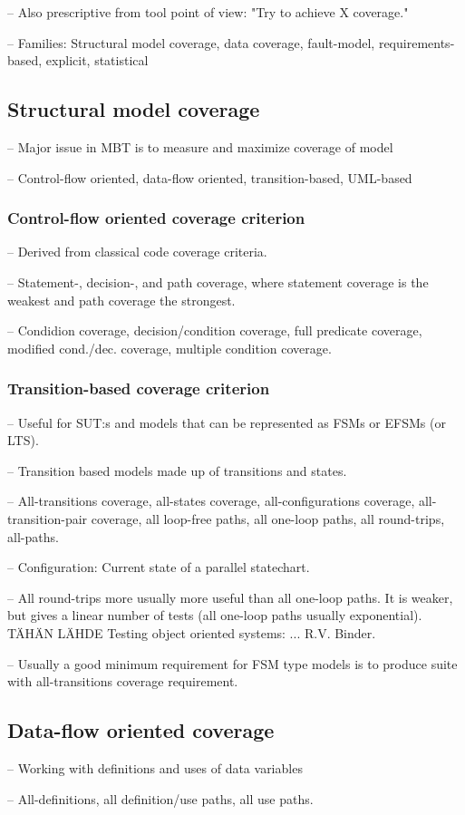 -- Also prescriptive from tool point of view: "Try to achieve X coverage."

-- Families: Structural model coverage, data coverage, fault-model, requirements-based, explicit, statistical

\subsection{Structural model coverage}
-- Major issue in MBT is to measure and maximize coverage of model

-- Control-flow oriented, data-flow oriented, transition-based, UML-based

\subsubsection{Control-flow oriented coverage criterion}
--  Derived from classical code coverage criteria.

-- Statement-, decision-, and path coverage, where statement coverage is the weakest and path coverage the strongest.

-- Condidion coverage, decision/condition coverage, full predicate coverage, modified cond./dec. coverage, multiple condition coverage.

\subsubsection{Transition-based coverage criterion}
-- Useful for SUT:s and models that can be represented as FSMs or EFSMs (or LTS).

-- Transition based models made up of transitions and states.

-- All-transitions coverage, all-states coverage, all-configurations coverage, all-transition-pair coverage, all loop-free paths, all one-loop paths, all round-trips, all-paths.

-- Configuration: Current state of a parallel statechart.

-- All round-trips more usually more useful than all one-loop paths. It is weaker, but gives a linear number of tests (all one-loop paths usually exponential). TÄHÄN LÄHDE Testing object oriented systems: ... R.V. Binder.

-- Usually a good minimum requirement for FSM type models is to produce suite with all-transitions coverage requirement.

\subsection{Data-flow oriented coverage}
-- Working with definitions and uses of data variables

-- All-definitions, all definition/use paths, all use paths.